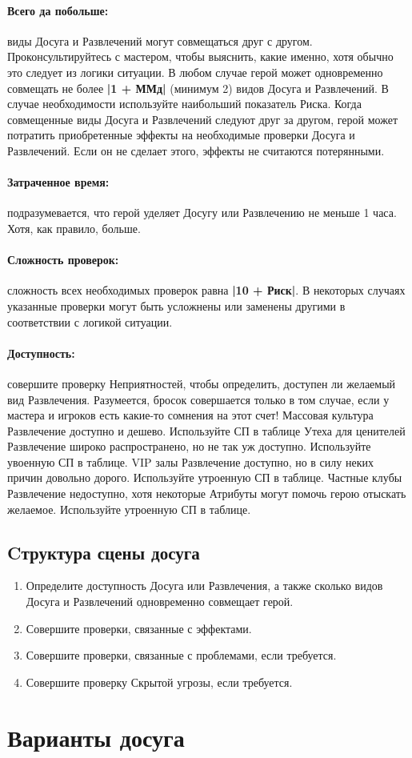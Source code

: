 \paragraph{Всего да побольше:} виды Досуга и Развлечений могут совмещаться друг с другом. Проконсультируйтесь с мастером, чтобы выяснить, какие именно, хотя обычно это следует из логики ситуации. В любом случае герой может одновременно совмещать не более \textbf{|1 + ММд|} (минимум 2) видов Досуга и Развлечений. В случае необходимости используйте наибольший показатель Риска. Когда совмещенные виды Досуга и Развлечений следуют друг за другом, герой может потратить приобретенные эффекты на необходимые проверки Досуга и Развлечений. Если он не сделает этого, эффекты не считаются потерянными.
\paragraph{Затраченное время:} подразумевается, что герой уделяет Досугу или Развлечению не меньше 1 часа. Хотя, как правило, больше.
\paragraph{Сложность проверок:} сложность всех необходимых проверок равна \textbf{|10 + Риск|}. В некоторых случаях указанные проверки могут быть усложнены или заменены другими в соответствии с логикой ситуации.
\paragraph{Доступность:} совершите проверку Неприятностей, чтобы определить, доступен ли желаемый вид Развлечения. Разумеется, бросок совершается только в том случае, если у мастера и игроков есть какие-то сомнения на этот счет!
\trouble
{Массовая культура}%
{Развлечение доступно и дешево. Используйте СП в таблице}%
{Утеха для ценителей}%
{Развлечение широко распространено, но не так уж доступно. Используйте увоенную СП в таблице.}%
{VIP залы}%
{Развлечение доступно, но в силу неких причин довольно дорого. Используйте утроенную СП в таблице.}%
{Частные клубы}%
{Развлечение недоступно, хотя некоторые Атрибуты могут помочь герою отыскать желаемое. Используйте утроенную СП в таблице.}%
\subsection{Cтруктура сцены досуга}
\begin{enumerate}
\item Определите доступность Досуга или Развлечения, а также сколько видов Досуга и Развлечений одновременно совмещает герой.
\item Совершите проверки, связанные с эффектами.
\item Совершите проверки, связанные с проблемами, если требуется.
\item Совершите проверку Скрытой угрозы, если требуется.
\end{enumerate}
\section{Варианты досуга}
